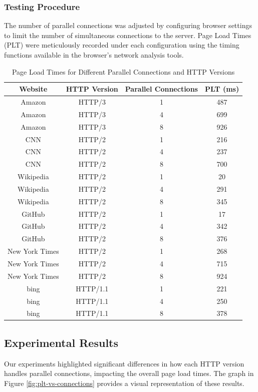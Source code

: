 \documentclass[a4paper,10pt]{article}
\begin{document}
\subsubsection{Testing Procedure}
The number of parallel connections was adjusted by configuring browser settings to limit the number of simultaneous connections to the server. Page Load Times (PLT) were meticulously recorded under each configuration using the timing functions available in the browser's network analysis tools.

\begin{table}[H]
\centering
\begin{tabular}{|c|c|c|c|}
\hline
\textbf{Website} & \textbf{HTTP Version} & \textbf{Parallel Connections} & \textbf{PLT (ms)} \\
\hline
Amazon & HTTP/3 & 1 & 487 \\
Amazon & HTTP/3 & 4 & 699 \\
Amazon & HTTP/3 & 8 & 926 \\
CNN & HTTP/2 & 1 & 216 \\
CNN & HTTP/2 & 4 & 237 \\
CNN & HTTP/2 & 8 & 700 \\
Wikipedia & HTTP/2 & 1 & 20 \\
Wikipedia & HTTP/2 & 4 & 291 \\
Wikipedia & HTTP/2 & 8 & 345 \\
GitHub & HTTP/2 & 1 & 17 \\
GitHub & HTTP/2 & 4 & 342 \\
GitHub & HTTP/2 & 8 & 376\\
New York Times & HTTP/2 & 1 & 268 \\
New York Times & HTTP/2 & 4 & 715 \\
New York Times & HTTP/2 & 8 & 924 \\
bing & HTTP/1.1 & 1 & 221 \\
bing & HTTP/1.1 & 4 & 250 \\
bing & HTTP/1.1 & 8 & 378 \\
\hline
\end{tabular}
\caption{Page Load Times for Different Parallel Connections and HTTP Versions}
\label{tab:page_load_times}
\end{table}

\subsection{Experimental Results}
Our experiments highlighted significant differences in how each HTTP version handles parallel connections, impacting the overall page load times. The graph in Figure \ref{fig:plt-vs-connections} provides a visual representation of these results.
\end{document}
